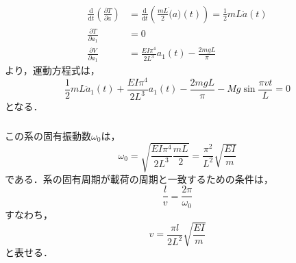 \documentclass[a4paper]{jsarticle}
\begin{document}
\subsubsection{}
\begin{align}
  \frac{\mathrm{d}}{\mathrm{d} t}
  \left(\frac{\partial T}{\partial \dot{a}}\right) & =
  \frac{\mathrm{d}}{\mathrm{d} t}
  \left(\frac{m L}{2} \dot(a)(t)\right) =
  \frac{1}{2} m L \ddot{a}(t)                            \\
  \frac{\partial T}{\partial a_1}                  & = 0 \\
  \frac{\partial V}{\partial a_1}                  & =
  \frac{E I \pi^4}{2 L^3} a_1(t) - \frac{2 m g L}{\pi}
\end{align}
より，運動方程式は，
\begin{equation}
  \frac{1}{2} m L \ddot{a}_1 (t)
  + \frac{E I \pi^4}{2 L^3} a_1(t)
  - \frac{2 m g L}{\pi}
  - M g \sin \frac{\pi v t}{L} = 0
\end{equation}
となる．

\subsubsection{}
この系の固有振動数$\omega_0$は，
\begin{equation}
  \omega_0 = \sqrt{\frac{E I \pi^4}{2 L^3} \frac{m L}{2}} =
  \frac{\pi^2}{L^2} \sqrt{\frac{E I}{m}}
\end{equation}
である．系の固有周期が載荷の周期と一致するための条件は，
\begin{equation}
  \frac{l}{v} =  \frac{2 \pi}{\omega_0}
\end{equation}
すなわち，
\begin{equation}
  v = \frac{\pi l}{2 L^2} \sqrt{\frac{E I}{m}}
\end{equation}
と表せる．

\subsection{}
\end{document}
